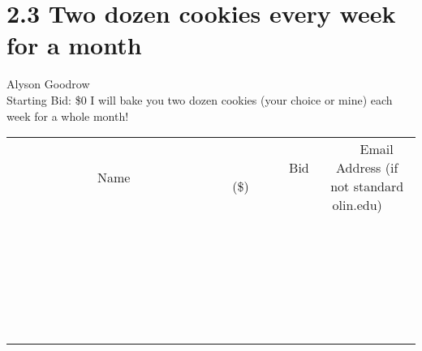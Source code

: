 \documentclass[11pt]{article}
\begin{document}
\section*{2.3 Two dozen cookies every week for a month}
Alyson Goodrow
\\
Starting Bid: \$0
\newline
I will bake you two dozen cookies (your choice or mine) each week for a whole month!
\\[6ex]
\begin{tabular}{c c c}
~~~~~~~~~~~~~Name~~~~~~~~~~~~~ & ~~~~~~~~~Bid (\$)~~~~~~~~~  & ~~~Email Address (if not standard olin.edu)~~~\\
 & & \\
\hline
 & & \\
\hline
 & & \\
\hline
 & & \\
\hline
 & & \\
\hline
 & & \\
\hline
 & & \\
\hline
 & & \\
\hline
 & & \\
\hline
 & & \\
\hline
 & & \\
\hline
 & & \\
\hline
 & & \\
\hline
 & & \\
\hline
 & & \\
\hline
 & & \\
\hline
 & & \\
\hline
 & & \\
\hline
 & & \\
\hline
 & & \\
\hline
 & & \\
\hline
 & & \\
\hline
 & & \\
\hline
 & & \\
\hline
 & & \\
\hline
 & & \\
\hline
\end{tabular}
\newpage
\end{document}
